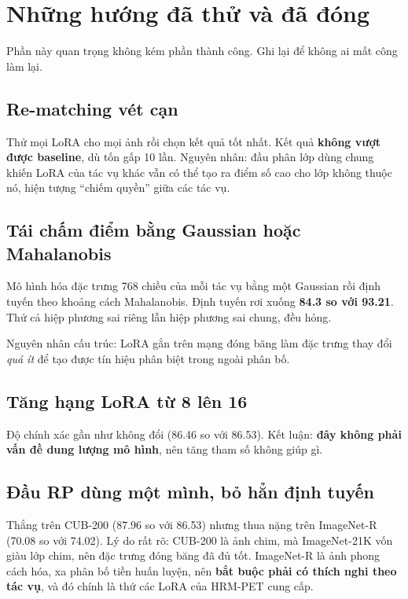 \documentclass[11pt,a4paper]{article}
\begin{document}
\section{Những hướng đã thử và đã đóng}

Phần này quan trọng không kém phần thành công. Ghi lại để không ai mất công làm
lại.

\subsection{Re-matching vét cạn}

Thử mọi LoRA cho mọi ảnh rồi chọn kết quả tốt nhất. Kết quả \textbf{không vượt
được baseline}, dù tốn gấp 10 lần. Nguyên nhân: đầu phân lớp dùng chung khiến
LoRA của tác vụ khác vẫn có thể tạo ra điểm số cao cho lớp không thuộc nó, hiện
tượng ``chiếm quyền'' giữa các tác vụ.

\subsection{Tái chấm điểm bằng Gaussian hoặc Mahalanobis}

Mô hình hóa đặc trưng 768 chiều của mỗi tác vụ bằng một Gaussian rồi định tuyến
theo khoảng cách Mahalanobis. Định tuyến rơi xuống \textbf{84.3 so với 93.21}.
Thử cả hiệp phương sai riêng lẫn hiệp phương sai chung, đều hỏng.

Nguyên nhân cấu trúc: LoRA gắn trên mạng đóng băng làm đặc trưng thay đổi
\emph{quá ít} để tạo được tín hiệu phân biệt trong ngoài phân bố.

\subsection{Tăng hạng LoRA từ 8 lên 16}

Độ chính xác gần như không đổi (86.46 so với 86.53). Kết luận: \textbf{đây không
phải vấn đề dung lượng mô hình}, nên tăng tham số không giúp gì.

\subsection{Đầu RP dùng một mình, bỏ hẳn định tuyến}

Thắng trên CUB-200 (87.96 so với 86.53) nhưng thua nặng trên ImageNet-R (70.08 so
với 74.02). Lý do rất rõ: CUB-200 là ảnh chim, mà ImageNet-21K vốn giàu lớp chim,
nên đặc trưng đóng băng đã đủ tốt. ImageNet-R là ảnh phong cách hóa, xa phân bố
tiền huấn luyện, nên \textbf{bắt buộc phải có thích nghi theo tác vụ}, và đó
chính là thứ các LoRA của HRM-PET cung cấp.
\end{document}
